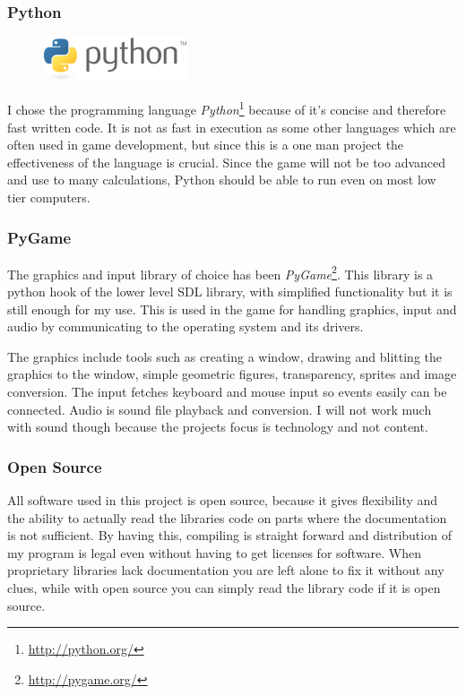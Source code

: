 \documentclass[a4paper,12pt]{article}
\begin{document}
\subsubsection{Python}
\begin{figure}
    \vspace{-30pt}
    \begin{center}
    \includegraphics[width=0.38\textwidth]{img/python-logo.eps}
    \end{center}
    \vspace{-40pt}
\end{figure}
I chose the programming language \emph{Python}\footnote{\url{http://python.org/}} because of it's concise and therefore fast written code. 
It is not as fast in execution as some other languages which are often used in game development, but since this is a one man project the effectiveness of the language is crucial.
Since the game will not be too advanced and use to many calculations, Python should be able to run even on most low tier computers.



\subsubsection{PyGame}
The graphics and input library of choice has been \emph{PyGame}\footnote{\url{http://pygame.org/}}. 
This library is a python hook of the lower level SDL library, with simplified functionality but it is still enough for my use.
This is used in the game for handling graphics, input and audio by communicating to the operating system and its drivers.

The graphics include tools such as creating a window, drawing and blitting the graphics to the window, simple geometric figures, transparency, sprites and image conversion.
The input fetches keyboard and mouse input so events easily can be connected.
Audio is sound file playback and conversion. I will not work much with sound though because the projects focus is technology and not content.

\subsubsection{Open Source}
All software used in this project is open source, because it gives flexibility and the ability to actually read the libraries code on parts where the documentation is not sufficient.
By having this, compiling is straight forward and distribution of my program is legal even without having to get licenses for software. 
When proprietary libraries lack documentation you are left alone to fix it without any clues, while with open source you can simply read the library code if it is open source.
\end{document}
